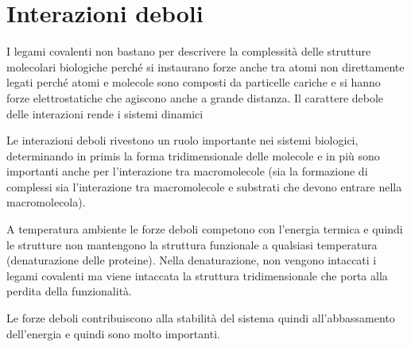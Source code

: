 \chapter{Interazioni deboli}

I legami covalenti non bastano per descrivere la complessità delle
strutture molecolari biologiche perché si instaurano forze anche tra
atomi non direttamente legati perché atomi e molecole sono composti da
particelle cariche e si hanno forze elettrostatiche che agiscono anche a
grande distanza.
Il carattere debole delle interazioni rende i sistemi dinamici


Le interazioni deboli rivestono un ruolo importante nei sistemi
biologici, determinando in primis la forma tridimensionale delle
molecole e in più sono importanti anche per l'interazione tra
macromolecole (sia la formazione di complessi sia l'interazione tra
macromolecole e substrati che devono entrare nella macromolecola).


A temperatura ambiente le forze deboli competono con l'energia termica e
quindi le strutture non mantengono la struttura funzionale a qualsiasi
temperatura (denaturazione delle proteine).
Nella denaturazione, non vengono intaccati i legami covalenti ma viene intaccata la
struttura tridimensionale che porta alla perdita della funzionalità.

Le forze deboli contribuiscono alla stabilità del sistema quindi
all'abbassamento dell'energia e quindi sono molto importanti.





